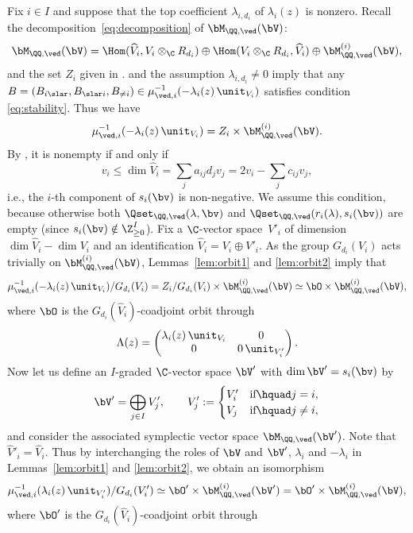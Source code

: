 Fix $i \in I$ and
suppose that the top coef\/f\/icient
$\lambda_{i,d_i}$ of $\lambda_i(z)$ is nonzero.
Recall the decomposition~\eqref{eq:decomposition} of $\bM_{\QQ,\ved}(\bV)$:
\[
\bM_{\QQ,\ved}(\bV) =\Hom(\widehat{V}_i,V_i \otimes_\C R_{d_i})
\oplus \Hom(V_i \otimes_\C R_{d_i}, \widehat{V}_i)
\oplus \bM^{(i)}_{\QQ,\ved}(\bV),
\]
and the set $Z_i$ given in .
 and the assumption $\lambda_{i,d_i} \neq 0$
imply that any
$B=(B_{i \slar},B_{\slar i},B_{\neq i})
\in \mu_{\ved,i}^{-1}(-\lambda_i(z)\,\unit_{V_i})$
satisf\/ies condition \eqref{eq:stability}.
Thus we have
\[
\mu_{\ved,i}^{-1}(-\lambda_i(z)\,\unit_{V_i})
=Z_i \times \bM^{(i)}_{\QQ,\ved}(\bV).
\]
By ,
it is nonempty if and only if
\[
v_i \leq \dim \widehat{V}_i
= \sum_j a_{ij} d_j v_j = 2v_i -\sum_j c_{ij}v_j,
\]
i.e., the $i$-th component of $s_i(\bv)$ is non-negative.
We assume this condition,
because otherwise both
$\Qset_{\QQ,\ved}(\lambda,\bv)$ and
$\Qset_{\QQ,\ved}(r_i(\lambda),s_i(\bv))$ are empty
(since $s_i(\bv) \notin \Z_{\geq 0}^I$).
Fix a $\C$-vector space~$V'_i$ of dimension
$\dim \widehat{V}_i - \dim V_i$ and an identif\/ication
$\widehat{V}_i = V_i \oplus V'_i$.
As the group $G_{d_i}(V_i)$ acts trivially on $\bM^{(i)}_{\QQ,\ved}(\bV)$,
Lemmas~\ref{lem:orbit1} and \ref{lem:orbit2} imply that
\[
\mu_{\ved,i}^{-1}(-\lambda_i(z)\,\unit_{V_i})/G_{d_i}(V_i) =
Z_i/G_{d_i}(V_i) \times \bM^{(i)}_{\QQ,\ved}(\bV)
\simeq \bO \times \bM^{(i)}_{\QQ,\ved}(\bV),
\]
where $\bO$ is the $G_{d_i}(\widehat{V}_i)$-coadjoint orbit
through
\[
\Lambda(z)= \begin{pmatrix}
\lambda_i(z)\,\unit_{V_i} & 0 \\
0 & 0\,\unit_{V'_i} \end{pmatrix}.
\]
Now let us def\/ine an $I$-graded $\C$-vector space $\bV'$
with $\dim \bV'=s_i(\bv)$ by
\[
\bV'=\bigoplus_{j \in I} V'_j, \qquad
V'_j := \begin{cases}
V'_i & \text{if}\hquad j=i, \\
V_j & \text{if}\hquad j\neq i,
\end{cases}
\]
and consider the associated symplectic vector space $\bM_{\QQ,\ved}(\bV')$.
Note that $\widehat{V}'_i =\widehat{V}_i$.
Thus by interchanging the roles of $\bV$ and $\bV'$,
$\lambda_i$ and $-\lambda_i$ in Lemmas~\ref{lem:orbit1} and \ref{lem:orbit2},
we obtain an isomorphism
\[
\mu_{\ved,i}^{-1}(\lambda_i(z)\,\unit_{V'_i})/G_{d_i}(V'_i) \simeq
\bO' \times \bM^{(i)}_{\QQ,\ved}(\bV')=\bO' \times \bM^{(i)}_{\QQ,\ved}(\bV),
\]
where $\bO'$ is the $G_{d_i}(\widehat{V}_i)$-coadjoint orbit through

